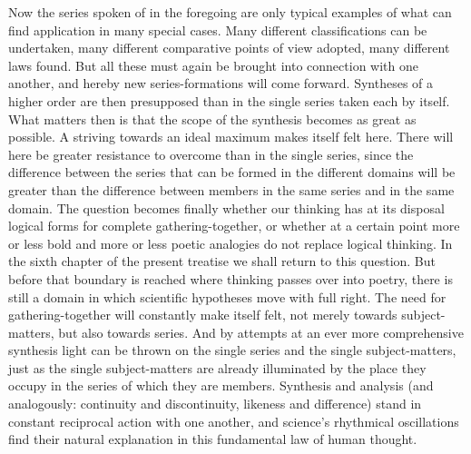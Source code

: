 \documentclass[12pt]{book}
\begin{document}
Now the series spoken of in the foregoing are only typical examples of what can
find application in many special cases. Many different classifications can be
undertaken, many different comparative points of view adopted, many different
laws found. But all these must again be brought into connection with one
another, and hereby new series-formations will come forward. Syntheses of a
higher order are then presupposed than in the single series taken each by
itself. What matters then is that the scope of the synthesis becomes as great as
possible. A striving towards an ideal maximum makes itself felt here. There will
here be greater resistance to overcome than in the single series, since the
difference between the series that can be formed in the different domains will
be greater than the difference between members in the same series and in the
same domain. The question becomes finally whether our thinking has at its
disposal logical forms for complete gathering-together, or whether at a certain
point more or less bold and more or less poetic analogies do not replace logical
thinking. In the sixth chapter of the present treatise we shall return to this
question. But before that boundary is reached where thinking passes over into
poetry, there is still a domain in which scientific hypotheses move with full
right. The need for gathering-together will constantly make itself felt, not
merely towards subject-matters, but also towards series. And by attempts at an
ever more comprehensive synthesis light can be thrown on the single series and
the single subject-matters, just as the single subject-matters are already
illuminated by the place they occupy in the series of which they are members.
Synthesis and analysis (and analogously: continuity and discontinuity, likeness
and difference) stand in constant reciprocal action with one another, and
science's rhythmical oscillations find their natural explanation in this
fundamental law of human thought.
\end{document}
